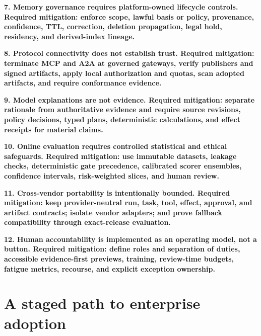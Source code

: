 \textbf{7. Memory governance requires platform-owned lifecycle controls. Required mitigation: enforce scope, lawful basis or policy, provenance, confidence, TTL, correction, deletion propagation, legal hold, residency, and derived-index lineage.}\par

\textbf{8. Protocol connectivity does not establish trust. Required mitigation: terminate MCP and A2A at governed gateways, verify publishers and signed artifacts, apply local authorization and quotas, scan adopted artifacts, and require conformance evidence.}\par

\textbf{9. Model explanations are not evidence. Required mitigation: separate rationale from authoritative evidence and require source revisions, policy decisions, typed plans, deterministic calculations, and effect receipts for material claims.}\par

\textbf{10. Online evaluation requires controlled statistical and ethical safeguards. Required mitigation: use immutable datasets, leakage checks, deterministic gate precedence, calibrated scorer ensembles, confidence intervals, risk-weighted slices, and human review.}\par

\textbf{11. Cross-vendor portability is intentionally bounded. Required mitigation: keep provider-neutral run, task, tool, effect, approval, and artifact contracts; isolate vendor adapters; and prove fallback compatibility through exact-release evaluation.}\par

\textbf{12. Human accountability is implemented as an operating model, not a button. Required mitigation: define roles and separation of duties, accessible evidence-first previews, training, review-time budgets, fatigue metrics, recourse, and explicit exception ownership.}\par


\section{A staged path to enterprise adoption}

